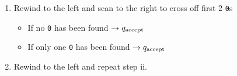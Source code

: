 \documentclass[11pt]{article}
\begin{document}
\begin{enumerate}
{\begin{enumerate}
\begin{enumerate}
\begin{itemize}
\begin{itemize}
                \item If a {\tt 0} has been found $\to \qacc$
            \end{itemize}
        \end{itemize}
        \item Rewind to the left and scan to the right to cross off first 2 {\tt 0}s
        \begin{itemize}
            \item If no {\tt 0} has been found $\to \qacc$
            \item If only one {\tt 0} has been found $\to \qacc$
        \end{itemize}
        \item Rewind to the left and repeat step ii. 
    \end{enumerate}
\end{enumerate}
}



\end{enumerate}
\end{document}
